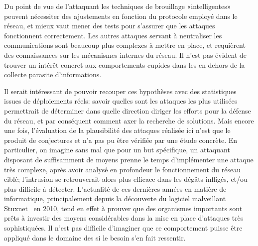 Du point de vue de l'attaquant les techniques de brouillage «intelligentes» peu\-vent nécessiter des ajustements en fonction du protocole \mac employé dans le réseau, et mieux vaut mener des tests pour s'assurer que les attaques fonctionnent correctement.
Les autres attaques servant à neutraliser les communications sont beaucoup plus complexes à mettre en place, et requièrent des connaissances sur les mécanismes internes du réseau.
Il n'est pas évident de trouver un intérêt concret aux comportements cupides dans les \rcs en dehors de la collecte parasite d'informations.

Il serait intéressant de pouvoir recouper ces hypothèses avec des statistiques issues de déploiements réels: savoir quelles sont les attaques les plus utilisées permettrait de déterminer dans quelle direction diriger les efforts pour la défense du réseau, et par conséquent comment axer la recherche de solutions.
Mais encore une fois, l'évaluation de la plausibilité des attaques réalisée ici n'est que le produit de conjectures et n'a pas pu être vérifiée par une étude concrète.
En particulier, on imagine sans mal que pour un but spécifique, un attaquant disposant de suffisamment de moyens prenne le temps d'implémenter une attaque très complexe, après avoir analysé en profondeur le fonctionnement du réseau ciblé; l'intrusion se retrouverait alors plus efficace dans les dégâts infligés, et/ou plus difficile à détecter.
L'actualité de ces dernières années en matière de \secu informatique, principalement depuis la découverte du logiciel malveillant Stuxnet~\cite{stuxnet} en 2010, tend en effet à prouver que des organismes importants sont prêts à investir des moyens considérables dans la mise en place d'attaques très sophistiquées.
Il n'est pas difficile d'imaginer que ce comportement puisse être appliqué dans le domaine des \rcs si le besoin s'en fait ressentir.
